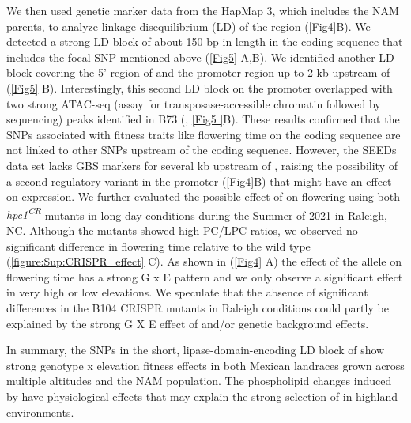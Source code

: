 We then used genetic marker data from the HapMap 3, which includes the NAM parents, \citep{bukowski2017-ng} to analyze linkage disequilibrium (LD) of the \hpc region (\autoref{Fig4}B).
We detected a strong LD block of about 150 bp in length in the coding sequence that includes the focal SNP mentioned above (\autoref{Fig5} A,B). 
We identified another LD block covering the 5' region of \hpc and the promoter region up to 2 kb upstream of \hpc (\autoref{Fig5} B). 
Interestingly, this second LD block on the promoter overlapped with two strong ATAC-seq (assay for transposase-accessible chromatin followed by sequencing) peaks identified in B73 (\citep{ricci2019-zj}, \autoref{Fig5 }B).
These results confirmed that the SNPs associated with fitness traits like flowering time on the \hpc coding sequence are not linked to other SNPs upstream of the \hpc coding sequence.
However, the SEEDs data set lacks GBS markers for several kb upstream of \hpc, raising the possibility of a second regulatory variant in the promoter (\autoref{Fig4}B) that might have an effect on \hpc expression. 
We further evaluated the possible effect of \hpc on flowering using both \textit{hpc1\textsuperscript{CR}} mutants in long-day conditions during the Summer of 2021 in Raleigh, NC. 
Although the mutants showed high PC/LPC ratios, we observed no significant difference in flowering time relative to the wild type (\autoref{figure:Sup:CRISPR_effect} C). 
As shown in (\autoref{Fig4} A) the effect of the \hpc allele on flowering time has a strong G x E pattern and we only observe a significant effect in very high or low elevations. 
We speculate that the absence of significant differences in the B104 CRISPR mutants in Raleigh conditions could partly be explained by the strong G X E effect of \hpc and/or genetic background effects. 

In summary, the SNPs in the short, lipase-domain-encoding LD block of \hpc show strong genotype x elevation fitness effects in both Mexican landraces grown across multiple altitudes and the NAM population.
The phospholipid changes induced by \hpc have physiological effects that may explain the strong selection of \hpc in highland environments.
